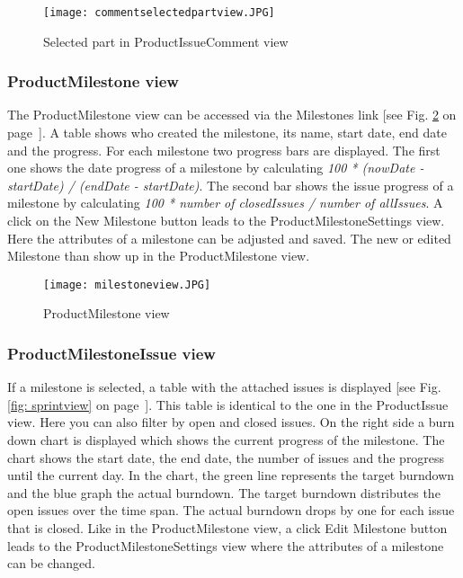     \begin{figure}[h]
        \centering
        \texttt{[image: commentselectedpartview.JPG]}
        \caption{Selected part in ProductIssueComment view}
        \label{fig: commentselectedpartview}
    \end{figure}

    \subsubsection*{ProductMilestone view}
    The ProductMilestone view can be accessed via the Milestones link [see Fig. \ref{fig: milestoneview} on page~\pageref{fig: milestoneview}]. A table shows who created the milestone, its name, start date, end date and the progress. For each milestone two progress bars are displayed. The first one shows the date progress of a milestone by calculating \textit{100 * (nowDate - startDate) / (endDate - startDate)}. The second bar shows the issue progress of a milestone by calculating \textit{100 * number of closedIssues / number of allIssues}.
    A click on the New Milestone button leads to the ProductMilestoneSettings view. Here the attributes of a milestone can be adjusted and saved. The new or edited Milestone than show up in the ProductMilestone view.

    \begin{figure}[h]
        \centering
        \texttt{[image: milestoneview.JPG]}
        \caption{ProductMilestone view}
        \label{fig: milestoneview}
    \end{figure}

    \subsubsection*{ProductMilestoneIssue view}
    If a milestone is selected, a table with the attached issues is displayed [see Fig. \ref{fig: sprintview} on page~\pageref{fig: sprintview}]. This table is identical to the one in the ProductIssue view. Here you can also filter by open and closed issues. On the right side a burn down chart is displayed which shows the current progress of the milestone. The chart shows the start date, the end date, the number of issues and the progress until the current day. In the chart, the green line represents the target burndown and the blue graph the actual burndown. The target burndown distributes the open issues over the time span. The actual burndown drops by one for each issue that is closed.  Like in the ProductMilestone view, a click Edit Milestone button leads to the ProductMilestoneSettings view where the attributes of a milestone can be changed.

